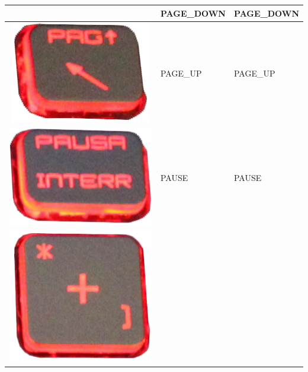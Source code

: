 \begin{longtable}{|cll|}
\begin{minipage}[c]{.3\textwidth}
\vspace{0.2cm}
\end{minipage} & PAGE\_DOWN & PAGE\_DOWN\\
\hline
\begin{minipage}[c]{.3\textwidth}
\vspace{0.2cm}
\includegraphics[scale=0.06]{Images/KeyMapping/PAGE_UP}
\vspace{0.2cm}
\end{minipage} & PAGE\_UP & PAGE\_UP\\
\hline
\begin{minipage}[c]{.3\textwidth}
\vspace{0.2cm}
\includegraphics[scale=0.06]{Images/KeyMapping/PAUSE}
\vspace{0.2cm}
\end{minipage} & PAUSE & PAUSE\\
\hline
\begin{minipage}[c]{.3\textwidth}
\vspace{0.2cm}
\includegraphics[scale=0.06]{Images/KeyMapping/PLUS}

\end{minipage}
\end{longtable}
